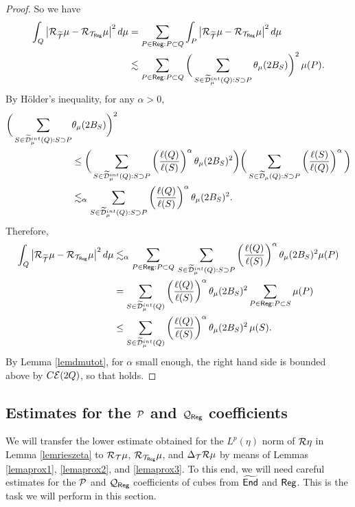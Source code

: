 \begin{proof}
So we have
\begin{align*}
\int_Q \big|{\mathcal R}_{{\widetilde{{\mathcal T}}}}\mu - {\mathcal R}_{{\mathcal T}_{\mathsf{Reg}}}\mu\big|^2\,d\mu &=\sum_{P\in{\mathsf{Reg}}:P\subset Q}
\int_P \big|{\mathcal R}_{{\widetilde{{\mathcal T}}}}\mu - {\mathcal R}_{{\mathcal T}_{\mathsf{Reg}}}\mu\big|^2\,d\mu\\
& \lesssim \sum_{P\in{\mathsf{Reg}}:P\subset Q}
\bigg(\sum_{S\in{\widetilde{{\mathcal D}}}_\mu^{int}(Q):S\supset P}
\theta_\mu(2B_S)\bigg)^2\,\mu(P).
\end{align*}
By H\"older's inequality, for any $\alpha>0$,
\begin{align*}
\bigg(\sum_{S\in{\widetilde{{\mathcal D}}}_\mu^{int}(Q):S\supset P} &
\theta_\mu(2B_S)\bigg)^2\\
&\leq \bigg(\sum_{S\in{\widetilde{{\mathcal D}}}_\mu^{int}(Q):S\supset P}\left(\frac{\ell(Q)}{\ell(S)}\right)^\alpha
\theta_\mu(2B_S)^2\bigg) \bigg(\sum_{S\in{\widetilde{{\mathcal D}}}_\mu(Q):S\supset P}\left(\frac{\ell(S)}{\ell(Q)}\right)^{\alpha}\bigg)\\
& \lesssim_\alpha \sum_{S\in{\widetilde{{\mathcal D}}}_\mu^{int}(Q):S\supset P}\left(\frac{\ell(Q)}{\ell(S)}\right)^\alpha
\theta_\mu(2B_S)^2.
\end{align*}
Therefore,
\begin{align*}
\int_Q \big|{\mathcal R}_{{\widetilde{{\mathcal T}}}}\mu - {\mathcal R}_{{\mathcal T}_{\mathsf{Reg}}}\mu\big|^2\,d\mu & \lesssim_\alpha 
\sum_{P\in{\mathsf{Reg}}:P\subset Q}\,\sum_{S\in{\widetilde{{\mathcal D}}}_\mu^{int}(Q):S\supset P}\left(\frac{\ell(Q)}{\ell(S)}\right)^\alpha
\theta_\mu(2B_S)^2\mu(P)\\
& =
\sum_{S\in{\widetilde{{\mathcal D}}}_\mu^{int}(Q)}\left(\frac{\ell(Q)}{\ell(S)}\right)^\alpha
\theta_\mu(2B_S)^2 \sum_{P\in{\mathsf{Reg}}:P\subset S}\mu(P)\\
& \le \sum_{S\in{\widetilde{{\mathcal D}}}_\mu^{int}(Q)}\left(\frac{\ell(Q)}{\ell(S)}\right)^\alpha
\theta_\mu(2B_S)^2\,\mu(S).
\end{align*}
By Lemma \ref{lemdmutot}, for $\alpha$ small enough, the right hand side is bounded above by 
$C{\mathcal E}(2Q)$, so that  holds.
\end{proof}

\vv



\subsection{Estimates for the \texorpdfstring{${\mathcal P}$ and ${\mathcal Q}_{\mathsf{Reg}}$}{P and Q\_Reg} coefficients}

We will transfer the lower estimate obtained for the $L^p(\eta)$ norm of ${\mathcal R}\eta$ in Lemma
\ref{lemrieszeta} to ${\mathcal R}_{{\mathcal T}}\mu$, ${\mathcal R}_{{\mathcal T}_{\mathsf{Reg}}}\mu$, and $\Delta_{{\mathcal T}}{\mathcal R}\mu$ by means of
Lemmas \ref{lemaprox1}, \ref{lemaprox2}, and \ref{lemaprox3}. To this end, we will need careful 
estimates for the ${\mathcal P}$ and ${\mathcal Q}_{\mathsf{Reg}}$ coefficients of cubes from ${\widetilde{{\mathsf{End}}}}$ and  ${\mathsf{Reg}}$. This is the
task we will perform in this section.
\vv

